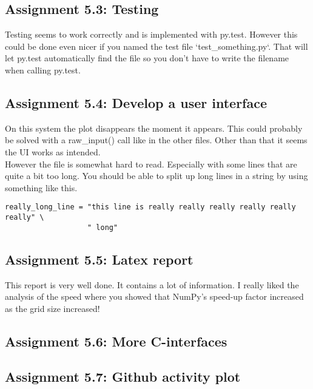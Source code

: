 \documentclass[a4paper]{article}
\begin{document}
\subsection*{Assignment 5.3: Testing}
Testing seems to work correctly and is implemented with py.test. However this could be done even nicer if you named the test file `test\_something.py`. That will let py.test automatically find the file so you don't have to write the filename when calling py.test.


\subsection*{Assignment 5.4:  Develop a user interface}
On this system the plot disappears the moment it appears. This could probably be solved with a raw\_input() call like in the other files.
Other than that it seems the UI works as intended.\\
\indent However the file is somewhat hard to read. Especially with some lines that are quite a bit too long. You should be able to split up long lines in a string by using something like this.

\begin{verbatim}
really_long_line = "this line is really really really really really really" \
                   " long"
\end{verbatim}


\subsection*{Assignment 5.5: Latex report}
This report is very well done. It contains a lot of information. I really liked the analysis of the speed where you showed that NumPy's speed-up factor increased as the grid size increased!

\subsection*{Assignment 5.6: More C-interfaces}

\subsection*{Assignment 5.7: Github activity plot}



\end{document}
